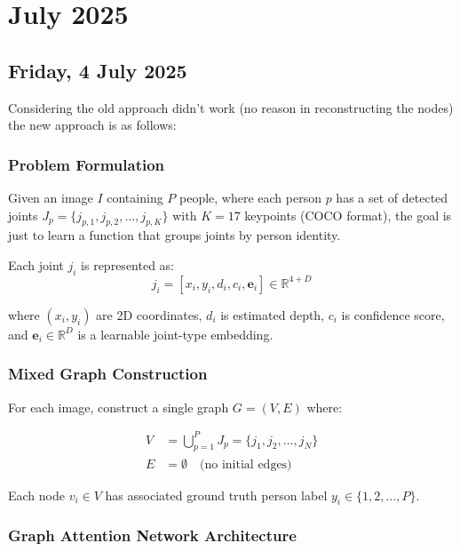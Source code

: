 \chapter[2025 July]{July 2025}

\section[2025/07/05]{Friday, 4 July 2025}
\label{sec:20250704}

Considering the old approach didn't work (no reason in reconstructing the nodes) the new approach is as follows:

\subsection{Problem Formulation}

Given an image $I$ containing $P$ people, where each person $p$ has a set of
detected joints $J_p = \{j_{p,1}, j_{p,2}, \ldots, j_{p,K}\}$ with $K=17$
keypoints (COCO format), the goal is just to learn a function that groups joints by
person identity.

Each joint $j_{i}$ is represented as:
\begin{equation}
\label{eq:joint_representation}
j_i = [x_i, y_i, d_i, c_i, \mathbf{e}_i] \in \mathbb{R}^{4+D}
\end{equation}

where $(x_i, y_i)$ are 2D coordinates, $d_i$ is estimated depth, $c_i$ is
confidence score, and $\mathbf{e}_i \in \mathbb{R}^D$ is a learnable joint-type
embedding.

\subsection{Mixed Graph Construction}

For each image, construct a single graph $G = (V, E)$ where:

\begin{align}
V &= \bigcup_{p=1}^{P} J_p = \{j_1, j_2, \ldots, j_N\} \\
E &= \emptyset \quad \text{(no initial edges)}
\end{align}

Each node $v_i \in V$ has associated ground truth person label $y_i \in \{1, 2, \ldots, P\}$.

\subsection{Graph Attention Network Architecture}

